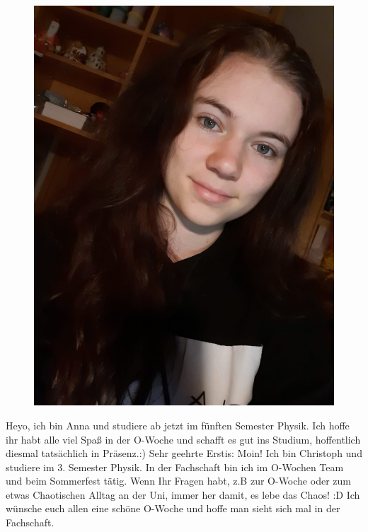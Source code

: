 \begin{multicols}{2}
{\begin{figure}
		\includegraphics[width=\fibelstdlen]{res/vorstellungsfotos/Fotos Selbstvorstellungstexte Fibel/Anna T.JPEG}
	\end{figure}
}
{
Heyo, ich bin Anna und studiere ab jetzt im fünften Semester Physik. 
Ich hoffe ihr habt alle viel Spaß in der O-Woche und schafft es gut ins Studium, hoffentlich diesmal tatsächlich in Präsenz.:)
}
{
Sehr geehrte Erstis: Moin!
Ich bin Christoph und studiere im 3. Semester Physik. In der Fachschaft bin ich im O-Wochen Team und beim Sommerfest tätig. Wenn Ihr Fragen habt, z.B zur O-Woche oder zum etwas Chaotischen Alltag an der Uni, immer her damit, es lebe das Chaos! :D 
Ich wünsche euch allen eine schöne O-Woche und hoffe man sieht sich mal in der Fachschaft.
}


\end{multicols}
